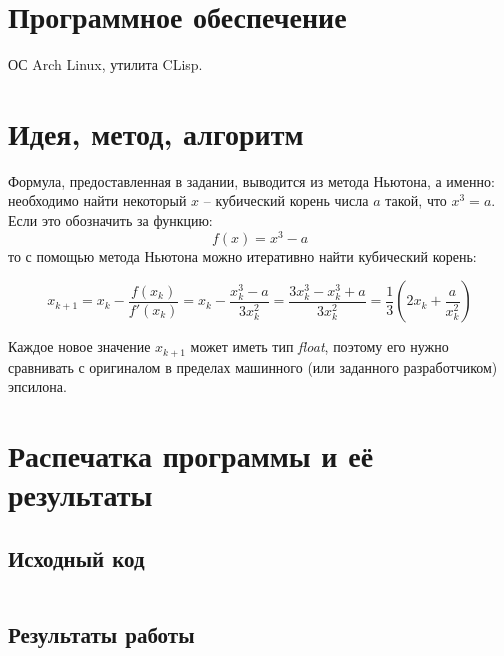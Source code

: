 \documentclass[12pt]{article}
\begin{document}
\section{Программное обеспечение}
ОС Arch Linux, утилита CLisp.

\section{Идея, метод, алгоритм}
Формула, предоставленная в задании, выводится из метода Ньютона, а именно: необходимо найти
некоторый $x$ \--- кубический корень числа $a$ такой, что $x^3 = a$. Если это обозначить за 
функцию: 
$$
f(x) = x^3 - a
$$
то с помощью метода Ньютона можно итеративно найти кубический корень:

$$
x_{k + 1} = x_{k} - \frac{f(x_{k})}{f'(x_{k})} 
          = x_{k} - \frac{x_{k}^3 - a}{3x_{k}^2}
          = \frac{3x_{k}^3 - x_{k}^3 + a}{3x_{k}^2} 
          = \frac{1}{3}\left(2x_{k} + \frac{a}{x_{k}^2}\right)
$$

Каждое новое значение $x_{k + 1}$ может иметь тип \textit{float}, поэтому его нужно сравнивать
с оригиналом в пределах машинного (или заданного разработчиком) эпсилона.


\section{Распечатка программы и её результаты}

\subsection{Исходный код}
% 
\inputminted[linenos, frame=lines]{lisp}{./cuberoot.lisp}

\subsection{Результаты работы}
% 
\inputminted[frame=lines]{lisp}{./log.lisp}

\end{document}
